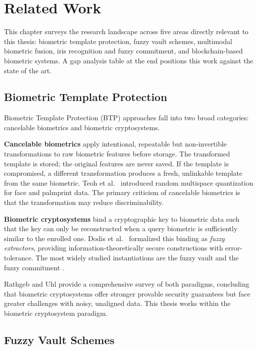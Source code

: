 \chapter{Related Work}
\label{ch:related}

This chapter surveys the research landscape across five areas directly relevant
to this thesis: biometric template protection, fuzzy vault schemes, multimodal
biometric fusion, iris recognition and fuzzy commitment, and blockchain-based
biometric systems. A gap analysis table at the end positions this work against
the state of the art.

\section{Biometric Template Protection}

Biometric Template Protection (BTP) approaches fall into two broad categories:
cancelable biometrics and biometric cryptosystems.

\textbf{Cancelable biometrics} \cite{ratha2007generating} apply intentional,
repeatable but non-invertible transformations to raw biometric features before
storage. The transformed template is stored; the original features are never saved.
If the template is compromised, a different transformation produces a fresh,
unlinkable template from the same biometric. Teoh et al.\ \cite{teoh2004random}
introduced random multispace quantization for face and palmprint data. The primary
criticism of cancelable biometrics is that the transformation may reduce
discriminability.

\textbf{Biometric cryptosystems} \cite{jain2008biometric} bind a cryptographic
key to biometric data such that the key can only be reconstructed when a query
biometric is sufficiently similar to the enrolled one. Dodis et
al.\ \cite{dodis2008fuzzy} formalized this binding as \emph{fuzzy extractors},
providing information-theoretically secure constructions with error-tolerance.
The most widely studied instantiations are the fuzzy vault \cite{juels2002fuzzy}
and the fuzzy commitment \cite{hao2006combining}.

Rathgeb and Uhl \cite{rathgeb2011survey} provide a comprehensive survey of
both paradigms, concluding that biometric cryptosystems offer stronger provable
security guarantees but face greater challenges with noisy, unaligned data. This
thesis works within the biometric cryptosystem paradigm.

\section{Fuzzy Vault Schemes}

